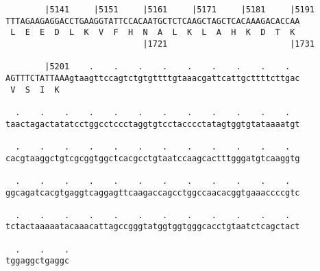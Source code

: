\documentclass{article}
\begin{document}
\begin{Verbatim}
        |5141     |5151     |5161     |5171     |5181     |5191
TTTAGAAGAGGACCTGAAGGTATTCCACAATGCTCTCAAGCTAGCTCACAAAGACACCAA
 L  E  E  D  L  K  V  F  H  N  A  L  K  L  A  H  K  D  T  K 
                            |1721                         |1731
  
        |5201    .    .    .    .    .    .    .    .    .  
AGTTTCTATTAAAgtaagttccagtctgtgttttgtaaacgattcattgcttttcttgac
 V  S  I  K                                                 
  
  .    .    .    .    .    .    .    .    .    .    .    .  
taactagactatatcctggcctccctaggtgtcctacccctatagtggtgtataaaatgt
  
  .    .    .    .    .    .    .    .    .    .    .    .  
cacgtaaggctgtcgcggtggctcacgcctgtaatccaagcactttgggatgtcaaggtg
  
  .    .    .    .    .    .    .    .    .    .    .    .  
ggcagatcacgtgaggtcaggagttcaagaccagcctggccaacacggtgaaaccccgtc
  
  .    .    .    .    .    .    .    .    .    .    .    .  
tctactaaaaatacaaacattagccgggtatggtggtgggcacctgtaatctcagctact
  
  .    .    .
tggaggctgaggc
\end{Verbatim}
\newpage
\end{document}
